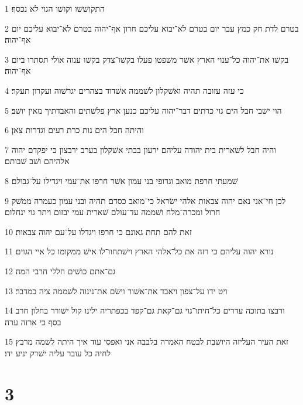 \par 1 התקושׁשׁו וקושׁו הגוי לא נכסף׃
\par 2 בטרם לדת חק כמץ עבר יום בטרם לא־יבוא עליכם חרון אף־יהוה בטרם לא־יבוא עליכם יום אף־יהוה׃
\par 3 בקשׁו את־יהוה כל־ענוי הארץ אשׁר משׁפטו פעלו בקשׁו־צדק בקשׁו ענוה אולי תסתרו ביום אף־יהוה׃
\par 4 כי עזה עזובה תהיה ואשׁקלון לשׁממה אשׁדוד בצהרים יגרשׁוה ועקרון תעקר׃
\par 5 הוי ישׁבי חבל הים גוי כרתים דבר־יהוה עליכם כנען ארץ פלשׁתים והאבדתיך מאין יושׁב׃
\par 6 והיתה חבל הים נות כרת רעים וגדרות צאן׃
\par 7 והיה חבל לשׁארית בית יהודה עליהם ירעון בבתי אשׁקלון בערב ירבצון כי יפקדם יהוה אלהיהם ושׁב שׁבותם׃
\par 8 שׁמעתי חרפת מואב וגדופי בני עמון אשׁר חרפו את־עמי ויגדילו על־גבולם׃
\par 9 לכן חי־אני נאם יהוה צבאות אלהי ישׂראל כי־מואב כסדם תהיה ובני עמון כעמרה ממשׁק חרול ומכרה־מלח ושׁממה עד־עולם שׁארית עמי יבזום ויתר גוי ינחלום׃
\par 10 זאת להם תחת גאונם כי חרפו ויגדלו על־עם יהוה צבאות׃
\par 11 נורא יהוה עליהם כי רזה את כל־אלהי הארץ וישׁתחוו־לו אישׁ ממקומו כל איי הגוים׃
\par 12 גם־אתם כושׁים חללי חרבי המה׃
\par 13 ויט ידו על־צפון ויאבד את־אשׁור וישׂם את־נינוה לשׁממה ציה כמדבר׃
\par 14 ורבצו בתוכה עדרים כל־חיתו־גוי גם־קאת גם־קפד בכפתריה ילינו קול ישׁורר בחלון חרב בסף כי ארזה ערה׃
\par 15 זאת העיר העליזה היושׁבת לבטח האמרה בלבבה אני ואפסי עוד איך היתה לשׁמה מרבץ לחיה כל עובר עליה ישׁרק יניע ידו׃

\chapter{3}

